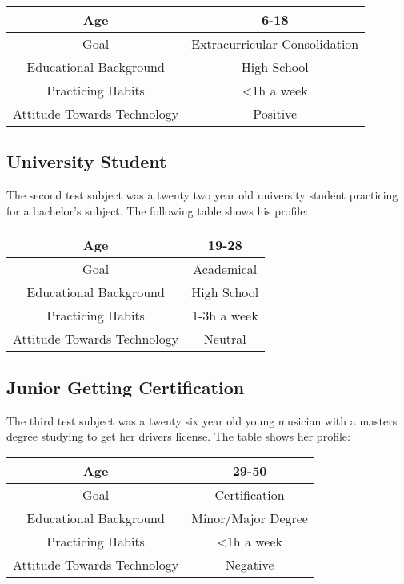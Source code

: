 \begin{center}
	\begin{tabular}{ | c | c | }
	\hline
		Age & 6-18 \\
	\hline
		Goal & Extracurricular Consolidation \\
	\hline
		Educational Background & High School \\
	\hline
		Practicing Habits & <1h a week \\
	\hline
		Attitude Towards Technology & Positive \\
	\hline

	\end{tabular}
\end{center}

\subsection{University Student}
The second test subject was a twenty two year old university student practicing
for a bachelor's subject. The following table shows his profile:

\begin{center}
	\begin{tabular}{ | c | c | }
	\hline
		Age & 19-28 \\
	\hline
		Goal & Academical \\
	\hline
		Educational Background & High School \\
	\hline
		Practicing Habits & 1-3h a week \\
	\hline
		Attitude Towards Technology & Neutral \\
	\hline

	\end{tabular}
\end{center}


\subsection{Junior Getting Certification}
The third test subject was a twenty six year old young musician with a masters 
degree studying to get her drivers license. The table shows her profile:

\begin{center}
	\begin{tabular}{ | c | c | }
	\hline
		Age & 29-50 \\
	\hline
		Goal & Certification \\
	\hline
		Educational Background & Minor/Major Degree \\
	\hline
		Practicing Habits & <1h a week \\
	\hline
		Attitude Towards Technology & Negative \\
	\hline

	\end{tabular}
\end{center}

